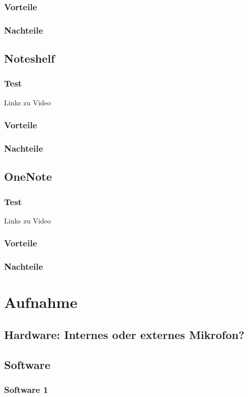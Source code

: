 \documentclass[parskip=off,index=totocnumbered]{scrreprt}
\begin{document}
\subsection{Vorteile}
\subsection{Nachteile}

\section{Noteshelf}
\subsection{Test}
Links zu Video
\subsection{Vorteile}
\subsection{Nachteile}

\section{OneNote}
\subsection{Test}
Links zu Video
\subsection{Vorteile}
\subsection{Nachteile}

\chapter{Aufnahme}
\section{Hardware: Internes oder externes Mikrofon?}
\section{Software}
\subsection{Software 1}
\end{document}

